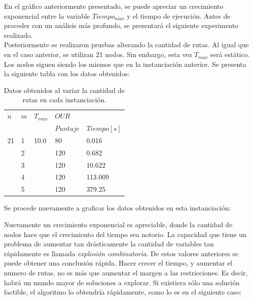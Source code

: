 \documentclass[letter, 10pt]{article}
\begin{document}
En el gráfico anteriormente presentado, se puede apreciar un crecimiento exponencial entre la variable $Tiempo_{m\acute{a}x}$ y el tiempo de ejecución. Antes de proceder con un análisis más profundo, se presentará el siguiente experimento realizado.  \\ 
\newline
Posteriormente se realizaron pruebas alterando la cantidad de rutas. Al igual que en el caso anterior, se utilizan 21 nodos. Sin embargo, esta vez $T_{m\acute{a}x}$ será estático. Los nodos siguen siendo los mismos que en la instanciación anterior. Se presenta la siguiente tabla con los datos obtenidos:

\begin{table}[ht]
\centering 
\begin{tabular}{|l|l|l| l l |}
\hline
 $n$ & $m$ & $T_{m\acute{a}x}$ & $OUR$     &           \\ 
               &          &                   & $Puntaje$ & $Tiempo[s]$  \\ 
\hline
21  & 1   & 10.0               &    80     &  0.016        \\
    & 2   &                &    120    &  0.682        \\
    & 3   &                &    120    &  10.622       \\
    & 4   &                &    120    &  113.009  \\
    & 5   &                &    120    &  379.25  \\
\hline

\end{tabular}
\caption{Datos obtenidos al variar la cantidad de rutas en cada instanciación.}
\end{table}

Se procede nuevamente a graficar los datos obtenidos en esta instanciación:

\newline
Nuevamente un crecimiento exponencial es apreciable, donde la cantidad de nodos hace que el crecimiento del tiempo sea notorio. La capacidad que tiene un problema de aumentar tan drásticamente la cantidad de variables tan rápidamente es llamada \textit{explosión combinatoria}. De estos valores anteriores se puede obtener una conclusión rápida. Hacer crecer el tiempo, y aumentar el numero de rutas, no es más que aumentar el margen a las restricciones. Es decir, habrá un mundo mayor de soluciones a explorar. Si existiera sólo una solución factible, el algoritmo lo obtendría rápidamente, como lo es en el siguiente caso: 
\end{document}
